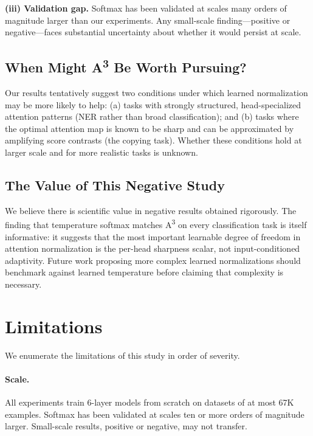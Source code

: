 \documentclass[11pt]{article}
\newcommand{\AAA}{\textsc{A\textsuperscript{3}}}
\begin{document}
\textbf{(iii) Validation gap.} Softmax has been validated at scales many orders of magnitude larger than our experiments. Any small-scale finding---positive or negative---faces substantial uncertainty about whether it would persist at scale.

\subsection{When Might \AAA{} Be Worth Pursuing?}

Our results tentatively suggest two conditions under which learned normalization may be more likely to help: (a) tasks with strongly structured, head-specialized attention patterns (NER rather than broad classification); and (b) tasks where the optimal attention map is known to be sharp and can be approximated by amplifying score contrasts (the copying task). Whether these conditions hold at larger scale and for more realistic tasks is unknown.

\subsection{The Value of This Negative Study}

We believe there is scientific value in negative results obtained rigorously. The finding that temperature softmax matches \AAA{} on every classification task is itself informative: it suggests that the most important learnable degree of freedom in attention normalization is the per-head sharpness scalar, not input-conditioned adaptivity. Future work proposing more complex learned normalizations should benchmark against learned temperature before claiming that complexity is necessary.

\section{Limitations}
\label{sec:limitations}

We enumerate the limitations of this study in order of severity.

\paragraph{Scale.} All experiments train 6-layer models from scratch on datasets of at most 67K examples. Softmax has been validated at scales ten or more orders of magnitude larger. Small-scale results, positive or negative, may not transfer.
\end{document}
